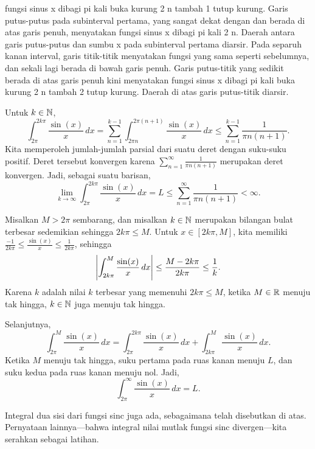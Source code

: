 \begin{example}
\begin{myfigureht}
{fungsi sinus x dibagi pi kali buka kurung 2 n tambah 1 tutup kurung.
Garis putus-putus pada subinterval pertama, yang sangat dekat dengan dan berada di atas
garis penuh, menyatakan fungsi sinus x dibagi pi kali 2 n.
Daerah antara garis putus-putus dan sumbu x pada subinterval pertama
diarsir.
Pada separuh kanan interval, garis titik-titik menyatakan
fungsi yang sama seperti sebelumnya, dan sekali lagi berada di bawah garis penuh.
Garis putus-titik yang sedikit berada di atas garis penuh
kini menyatakan fungsi sinus x dibagi pi kali buka kurung
2 n tambah 2 tutup kurung.  Daerah di atas garis putus-titik diarsir.}
\caption{Batas untuk $\int_{2\pi n}^{2\pi (n+1)} \frac{\sin(x)}{x} \,dx$ dengan menggunakan
integral yang diarsir (luas bertanda
$\frac{1}{\pi n} 
+
\frac{-1}{\pi (n+1)}$).\label{fig:sincbound}}
\end{myfigureht}

Untuk $k \in {\mathbb{N}}$, 
\begin{equation*}
\int_{2\pi}^{2k\pi} \frac{\sin(x)}{x} \,dx
=
\sum_{n=1}^{k-1}
\int_{2\pi n}^{2\pi (n+1)} \frac{\sin(x)}{x} \,dx 
\leq
\sum_{n=1}^{k-1}
\frac{1}{\pi n(n+1)} .
\end{equation*}
Kita memperoleh jumlah-jumlah parsial dari suatu deret dengan suku-suku positif.
Deret tersebut
konvergen karena
$\sum_{n=1}^\infty \frac{1}{\pi n (n+1)}$ merupakan deret konvergen.  Jadi,
sebagai suatu barisan,
\begin{equation*}
\lim_{k\to \infty} \int_{2\pi}^{2k\pi} \frac{\sin(x)}{x} \,dx
=L \leq
\sum_{n=1}^{\infty}
\frac{1}{\pi n(n+1)} < \infty .
\end{equation*}

Misalkan $M > 2\pi$ sembarang, dan misalkan $k \in {\mathbb{N}}$
merupakan bilangan bulat terbesar sedemikian sehingga $2k\pi \leq M$.
Untuk $x \in [2k\pi,M]$, kita memiliki
$\frac{-1}{2k\pi} \leq \frac{\sin(x)}{x} \leq \frac{1}{2k\pi}$, sehingga
\begin{equation*}
\left\lvert {\int_{2k\pi}^{M} \frac{\sin(x)}{x} \,dx } \right\rvert  \leq
\frac{M-2k\pi}{2k\pi} \leq \frac{1}{k} .
\end{equation*}
Karena $k$ adalah nilai $k$ terbesar yang memenuhi $2k\pi \leq M$,
ketika $M\in {\mathbb{R}}$ menuju tak hingga, $k \in {\mathbb{N}}$ juga menuju tak hingga.

Selanjutnya,
\begin{equation*}
\int_{2\pi}^M \frac{\sin(x)}{x}\,dx
=
\int_{2\pi}^{2k\pi} \frac{\sin(x)}{x} \,dx
+
\int_{2k\pi}^{M} \frac{\sin(x)}{x} \,dx .
\end{equation*}
Ketika $M$ menuju tak hingga,
suku pertama pada
ruas kanan menuju $L$,
dan suku kedua pada
ruas kanan
menuju nol.  Jadi,
\begin{equation*}
\int_{2\pi}^\infty \frac{\sin(x)}{x} \,dx = L .
\end{equation*}

Integral dua sisi dari fungsi sinc juga ada, sebagaimana telah disebutkan di atas.
Pernyataan lainnya---bahwa integral
nilai mutlak fungsi sinc divergen---kita serahkan sebagai latihan.
\end{example}

